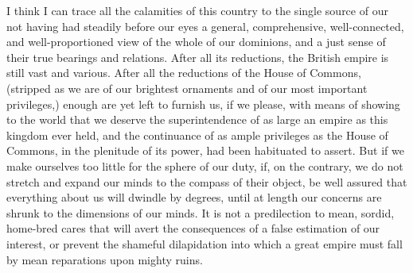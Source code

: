 I think I can trace all the calamities of this country to the single source of our not having had steadily before our eyes a general, comprehensive, well-connected, and well-proportioned view of the whole of our dominions, and a just sense of their true bearings and relations. After all its reductions, the British empire is still vast and various. After all the reductions of the House of Commons, (stripped as we are of our brightest ornaments and of our most important privileges,) enough are yet left to furnish us, if we please, with means of showing to the world that we deserve the superintendence of as large an empire as this kingdom ever held, and the continuance of as ample privileges as the House of Commons, in the plenitude of its power, had been habituated to assert. But if we make ourselves too little for the sphere of our duty, if, on the contrary, we do not stretch and expand our minds to the compass of their object, be well assured that everything about us will dwindle by degrees, until at length our concerns are shrunk to the dimensions of our minds. It is not a predilection to mean, sordid, home-bred cares that will avert the consequences of a false estimation of our interest, or prevent the shameful dilapidation into which a great empire must fall by mean reparations upon mighty ruins.

